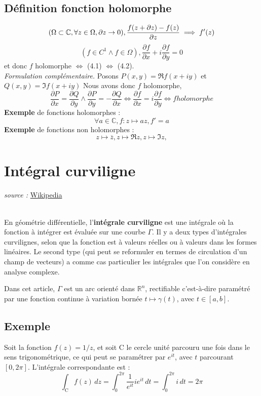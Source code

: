 \documentclass[a4paper]{book}
\begin{document}
\subsection{Définition fonction holomorphe}
\begin{equation}
	(\Omega \subset \mathbb{C}, \forall z \in \Omega , \partial z \rightarrow
	0),
\\
	\frac{f(z + \partial z) - f(z)}{\partial z} \implies f'(z)
\end{equation}
\begin{equation}
	( f \in C^{1} \wedge f \in \Omega ),
	\frac{\partial f}{\partial x} + i\frac{\partial f}{\partial y} = 0
\end{equation}
et donc $f$ holomorphe $\iff$ (4.1) $\iff$ (4.2).\\ 

\emph{Formulation complémentaire.} Posons $P(x,y)=\Re f(x+iy)$ et 
$Q(x,y)=\Im f(x+iy)$
Nous avons donc $f$ holomorphe,
\[
	\frac{\partial P}{\partial x} = \frac{\partial Q}{\partial y}
	\wedge
	\frac{\partial P}{\partial y} = -\frac{\partial Q}{\partial x}
	\iff
	\frac{\partial f}{\partial x} = i \frac{\partial f}{\partial y}
	\iff
	f holomorphe
\]
\textbf{Exemple} de fonctions holomorphes :
\[
	\forall a \in \mathbb{C}, f:z \mapsto az , f'=a
\]
\textbf{Exemple} de fonctions non holomorphes :
\[
	z \mapsto \overline{z},
	z \mapsto \Re z ,
	z \mapsto \Im z ,
\]

\section{Intégral curviligne}
\emph{source :} 
\href{https://fr.wikipedia.org/wiki/Int%C3%A9grale_curviligne}{Wikipedia}

\\

En géométrie différentielle, l'\textbf{intégrale curviligne} est une intégrale où la
fonction à intégrer est évaluée sur une courbe $\Gamma$. Il y a deux types d'intégrales
curvilignes, selon que la fonction est à valeurs réelles ou à valeurs dans les
formes linéaires. Le second type (qui peut se reformuler en termes de
circulation d'un champ de vecteurs) a comme cas particulier les intégrales que
l'on considère en analyse complexe.

Dans cet article, $\Gamma$ est un arc orienté dans $\mathbb{R}^n$, rectifiable c'est-à-dire
paramétré par une fonction continue à variation bornée $t \mapsto \gamma(t)$,
avec $t \in [a,b]$. 

\subsection{Exemple}
Soit la fonction $f(z) = 1/z$, et soit $\mathrm{C}$ le cercle unité parcouru une fois dans le
sens trigonométrique, ce qui peut se paramétrer par $e^{it}$, avec $t$
parcourant $[0,2\pi]$. L'intégrale correspondante est :
\begin{equation}
	\int_{\mathrm{C}} f(z) \, dz = \int_{0}^{2\pi} \frac{1}{e^{it}} i e^{it}
	\, dt = \int_{0}^{2\pi} i \, dt = 2\pi
\end{equation}
\end{document}

